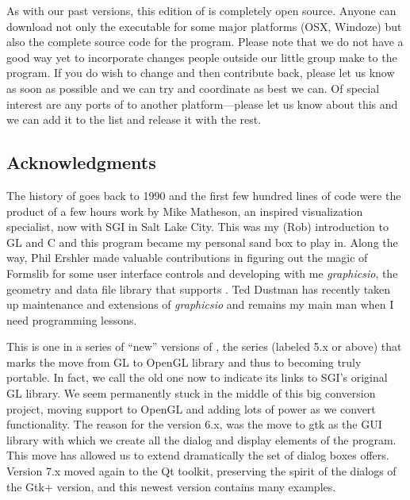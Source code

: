 As with our past versions, this edition of \map{} is completely open
source.  Anyone can download not only the executable for some major
platforms (OSX, Windoze) but also the complete source code for
the program.  Please note that we do not have a good way yet to incorporate
changes people outside our little group make to the program.  If you do
wish to change and then contribute back, please let us know as soon as
possible and we can try and coordinate as best we can.  Of special interest
are any ports of \map{} to another platform---please let us know about this
and we can add it to the list and release it with the rest.

\subsection{Acknowledgments}

The history of \map{} goes back to 1990 and the first few hundred lines of
code were the product of a few hours work by Mike Matheson, an inspired
visualization specialist, now with SGI in Salt Lake City.  This was my
(Rob) introduction to GL and C and this program became my personal sand box
to play in.  Along the way, Phil Ershler made valuable contributions in
figuring out the magic of Formslib for some user interface controls and
developing with me \emph{graphicsio}, the geometry and data file library
that supports \map{}.  Ted Dustman has recently taken up maintenance and
extensions of \emph{graphicsio} and remains my main man when I need
programming lessons.

This is one in a series of ``new'' versions of \map{}, the series (labeled
5.x or above) that marks the move from GL to OpenGL library and thus to
becoming truly portable.  In fact, we call the old one \mapgl{} now to
indicate its links to SGI's original GL library.  We seem permanently stuck
in the middle of this big conversion project, moving support to OpenGL and
adding lots of power as we convert functionality.  The reason for the
version 6.x, was the move to gtk as the GUI library with which we create
all the dialog and display elements of the program.  This move has allowed
us to extend dramatically the set of dialog boxes \map{} offers. 
Version 7.x moved again to the Qt toolkit, preserving the spirit of the dialogs of the Gtk+ version, and this
newest version \version{} contains many examples.

